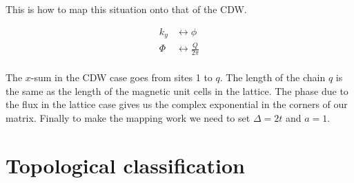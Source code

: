 \documentclass[letterpaper, 10 pt, conference]{ieeeconf}  %
\begin{document}
This is how to map this situation onto that of the CDW.

\begin{align*}
k_{y} &\leftrightarrow \phi  \\
\Phi &\leftrightarrow \frac{Q}{2\pi} \\
\end{align*}

The $x$-sum in the CDW case goes from sites 1 to $q$.
The length of the chain $q$ is the same as the length of the magnetic unit cells in the lattice.
The phase due to the flux in the lattice case gives us the complex exponential in the corners of our matrix.
Finally to make the mapping work we need to set $\Delta = 2t$ and $a=1$.


\section{Topological classification}
\end{document}
